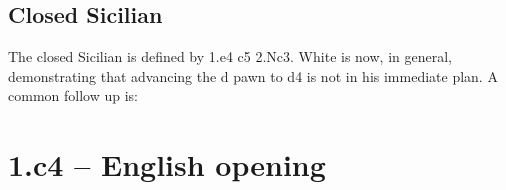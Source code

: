 \documentclass[
10pt, %
a4paper, %
oneside, %
headinclude,footinclude, %
BCOR5mm, %
]{scrartcl}
\begin{document}
\newgame %
\begin{center}
\showboard
\end{center}


\subsection{Closed Sicilian}

The closed Sicilian is defined by 1.e4 c5 2.Nc3. White is now, in general, demonstrating that advancing the d pawn to d4 is not in his immediate plan. A common follow up is:

\newgame %
\begin{center}
\showboard
\end{center}



\newpage
\section{1.c4 -- English opening}
\end{document}
